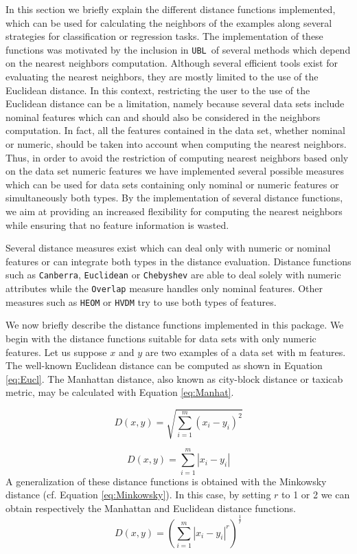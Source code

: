 \documentclass[10pt,a4paper]{article}\usepackage[]{graphicx}\usepackage[]{color}
\newcommand{\UBL}{\texttt{UBL}\ }
\begin{document}
In this section we briefly explain the different distance functions implemented, which can be used for calculating the neighbors of the examples along several strategies for classification or regression tasks.
The implementation of these functions was motivated by the inclusion in \UBL of several methods which depend on the nearest neighbors computation. Although several efficient tools exist for evaluating the nearest neighbors, they are mostly limited to the use of the Euclidean distance. In this context, restricting the user to the use of the Euclidean distance can be a limitation, namely because several data sets include nominal features which can and should also be considered in the neighbors computation. In fact, all the features contained in the data set, whether nominal or numeric, should be taken into account when computing the nearest neighbors. Thus, in order to avoid the restriction of computing nearest neighbors based only on the data set numeric features we have implemented several possible measures which can be used for data sets containing only nominal or numeric features or simultaneously both types. By the implementation of several distance functions, we aim at providing an increased flexibility for computing the nearest neighbors while ensuring that no feature information is wasted.

Several distance measures exist which can deal only with numeric or nominal features or can integrate both types in the distance evaluation. Distance functions such as \texttt{Canberra}, \texttt{Euclidean} or \texttt{Chebyshev} are able to deal solely with numeric attributes while the \texttt{Overlap} measure handles only nominal features. Other measures such as \texttt{HEOM} or \texttt{HVDM} try to use both types of features.

We now briefly describe the distance functions implemented in this package. We begin with the distance functions suitable for data sets with only numeric features. Let us suppose $x$ and $y$ are two examples of a data set with m features. The well-known Euclidean distance can be computed as shown in Equation \ref{eq:Eucl}. The Manhattan distance, also known as city-block distance or taxicab metric, may be calculated with Equation \ref{eq:Manhat}. 

\begin{equation}\label{eq:Eucl}
D(x,y)=\sqrt{ \sum_{i=1}^{m}(x_i-y_i)^2 }
\end{equation}

\begin{equation}\label{eq:Manhat}
D(x,y)=\sum_{i=1}^{m}|x_i-y_i|
\end{equation}
A generalization of these distance functions is obtained with the Minkowsky distance (cf. Equation \ref{eq:Minkowsky}). In this case, by setting $r$ to 1 or 2 we can obtain respectively the Manhattan and Euclidean distance functions.
\begin{equation}\label{eq:Minkowsky}
D(x,y)=\left( \sum_{i=1}^{m}|x_i-y_i|^r\right) ^{\frac{1}{r}}
\end{equation}
\end{document}
